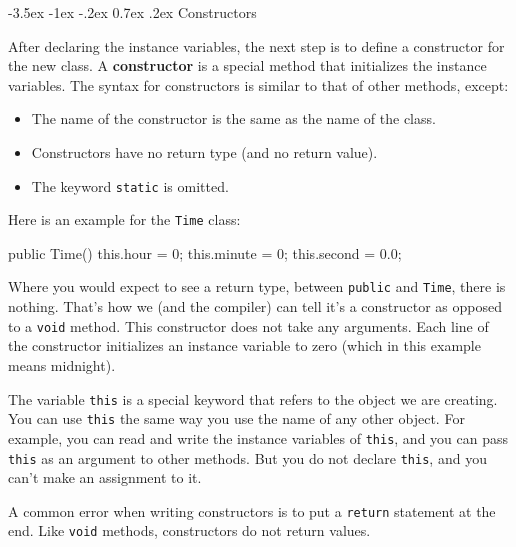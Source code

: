 \documentclass[12pt]{book}
\makeatletter
\theoremstyle{exercise}
\newcommand{\java}[1]{\verb"#1"}
\renewcommand{\section}{\@startsection{section}{1}{\z@}%
    {-3.5ex \@plus -1ex \@minus -.2ex}%
    {0.7ex \@plus.2ex}%
    {\normalfont\Large\bfseries}}
\newcommand{\java}[1]{\lstinline{#1}} %
\makeatother
\begin{document}


\section{Constructors}


After declaring the instance variables, the next step is to define a constructor for the new class.
A {\bf constructor} is a special method that initializes the instance variables.
The syntax for constructors is similar to that of other methods, except:

\begin{itemize}
\item The name of the constructor is the same as the name of the class.
\item Constructors have no return type (and no return value).
\item The keyword \java{static} is omitted.
\end{itemize}

Here is an example for the \java{Time} class:

\begin{code}
    public Time() {
        this.hour = 0;
        this.minute = 0;
        this.second = 0.0;
    }
\end{code}

Where you would expect to see a return type, between \java{public} and \java{Time}, there is nothing.
That's how we (and the compiler) can tell it's a constructor as opposed to a \java{void} method.
This constructor does not take any arguments.
Each line of the constructor initializes an instance variable to zero (which in this example means midnight).


The variable \java{this} is a special keyword that refers to the object we are creating.
You can use \java{this} the same way you use the name of any other object.
For example, you can read and write the instance variables of \java{this}, and you can pass \java{this} as an argument to other methods.
But you do not declare \java{this}, and you can't make an assignment to it.

A common error when writing constructors is to put a \java{return} statement at the end.
Like \java{void} methods, constructors do not return values.
\end{document}
